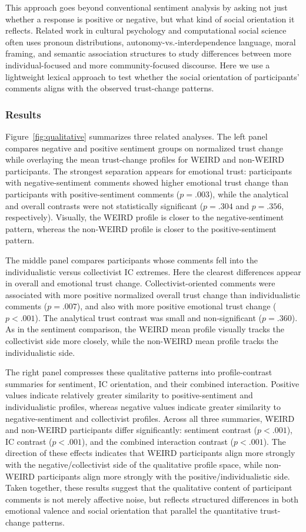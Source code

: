 This approach goes beyond conventional sentiment analysis by asking not just whether a response is positive or negative, but what kind of social orientation it reflects. Related work in cultural psychology and computational social science often uses pronoun distributions, autonomy-vs.-interdependence language, moral framing, and semantic association structures to study differences between more individual-focused and more community-focused discourse. Here we use a lightweight lexical approach to test whether the social orientation of participants' comments aligns with the observed trust-change patterns.

\subsubsection{Results}
Figure~\ref{fig:qualitative} summarizes three related analyses. The left panel compares negative and positive sentiment groups on normalized trust change while overlaying the mean trust-change profiles for WEIRD and non-WEIRD participants. The strongest separation appears for emotional trust: participants with negative-sentiment comments showed higher emotional trust change than participants with positive-sentiment comments ($p=.003$), while the analytical and overall contrasts were not statistically significant ($p=.304$ and $p=.356$, respectively). Visually, the WEIRD profile is closer to the negative-sentiment pattern, whereas the non-WEIRD profile is closer to the positive-sentiment pattern.

The middle panel compares participants whose comments fell into the individualistic versus collectivist IC extremes. Here the clearest differences appear in overall and emotional trust change. Collectivist-oriented comments were associated with more positive normalized overall trust change than individualistic comments ($p=.007$), and also with more positive emotional trust change ($p<.001$). The analytical trust contrast was small and non-significant ($p=.360$). As in the sentiment comparison, the WEIRD mean profile visually tracks the collectivist side more closely, while the non-WEIRD mean profile tracks the individualistic side.

The right panel compresses these qualitative patterns into profile-contrast summaries for sentiment, IC orientation, and their combined interaction. Positive values indicate relatively greater similarity to positive-sentiment and individualistic profiles, whereas negative values indicate greater similarity to negative-sentiment and collectivist profiles. Across all three summaries, WEIRD and non-WEIRD participants differ significantly: sentiment contrast ($p<.001$), IC contrast ($p<.001$), and the combined interaction contrast ($p<.001$). The direction of these effects indicates that WEIRD participants align more strongly with the negative/collectivist side of the qualitative profile space, while non-WEIRD participants align more strongly with the positive/individualistic side. Taken together, these results suggest that the qualitative content of participant comments is not merely affective noise, but reflects structured differences in both emotional valence and social orientation that parallel the quantitative trust-change patterns.

